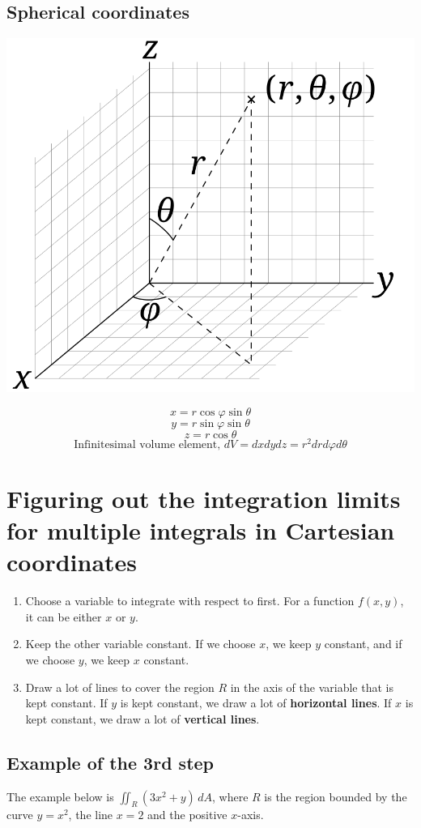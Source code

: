 \documentclass[11pt]{article}
\begin{document}
\subsection{Spherical coordinates}
\label{sec:org6d9cc71}
\begin{center}
\includegraphics[width=.9\linewidth]{./images/spherical-coordinates.png}
\end{center}
\[x = r \cos \varphi \sin \theta\]
\[y = r \sin \varphi \sin \theta\]
\[z = r \cos \theta\]
\[\text{Infinitesimal volume element, } dV = dx dy dz = r^2 dr d \varphi d \theta\]

 \newpage
\section{Figuring out the integration limits for multiple integrals in Cartesian coordinates}
\label{sec:orgf1e6856}
\begin{enumerate}
\item Choose a variable to integrate with respect to first. For a function \(f(x, y)\), it can be either \(x\) or \(y\).
\item Keep the other variable constant. If we choose \(x\), we keep \(y\) constant, and if we choose \(y\), we keep \(x\) constant.
\item Draw a lot of lines to cover the region \(R\) in the axis of the variable that is kept constant. If \(y\) is kept constant, we draw a lot of \textbf{horizontal lines}. If \(x\) is kept constant, we draw a lot of \textbf{vertical lines}.
\end{enumerate}
\subsection{Example of the 3rd step}
\label{sec:orgf383b6c}
The example below is \(\iint_R (3x^2 + y) \, dA\), where \(R\) is the region bounded by the curve \(y = x^2\), the line \(x = 2\) and the positive \(x\)-axis.
\end{document}
